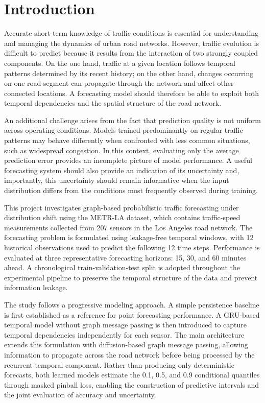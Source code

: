 \section*{Introduction}

Accurate short-term knowledge of traffic conditions is essential for understanding and managing the dynamics of urban road networks.
However, traffic evolution is difficult to predict because it results from the interaction of two strongly coupled components.
On the one hand, traffic at a given location follows temporal patterns determined by its recent history; on the other hand,
changes occurring on one road segment can propagate through the network and affect other connected locations.
A forecasting model should therefore be able to exploit both temporal dependencies and the spatial structure of the road network.

An additional challenge arises from the fact that prediction quality is not uniform across operating conditions.
Models trained predominantly on regular traffic patterns may behave differently when confronted with less common situations,
such as widespread congestion.
In this context, evaluating only the average prediction error provides an incomplete picture of model performance.
A useful forecasting system should also provide an indication of its uncertainty and, importantly, this uncertainty
should remain informative when the input distribution differs from the conditions most frequently observed during training.


This project investigates graph-based probabilistic traffic forecasting under distribution shift using the METR-LA dataset,
which contains traffic-speed measurements collected from 207 sensors in the Los Angeles road network.
The forecasting problem is formulated using leakage-free temporal windows, with 12 historical observations used to predict
the following 12 time steps.
Performance is evaluated at three representative forecasting horizons: 15, 30, and 60 minutes ahead.
A chronological train-validation-test split is adopted throughout the experimental pipeline to preserve the temporal
structure of the data and prevent information leakage.


The study follows a progressive modeling approach.
A simple persistence baseline is first established as a reference for point forecasting performance.
A GRU-based temporal model without graph message passing is then introduced to capture temporal dependencies independently
for each sensor.
The main architecture extends this formulation with diffusion-based graph message passing, allowing information to
propagate across the road network before being processed by the recurrent temporal component.
Rather than producing only deterministic forecasts, both learned models estimate the 0.1, 0.5, and 0.9 conditional
quantiles through masked pinball loss, enabling the construction of predictive intervals and the joint evaluation of
accuracy and uncertainty.


